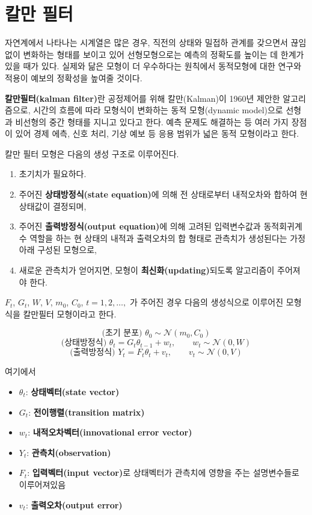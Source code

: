 \documentclass[b5paper,]{scrbook}
\theoremstyle{plain}
\theoremstyle{definition}
\numberwithin{equation}{section}
\begin{document}
\hypertarget{kalman}{%
\chapter{칼만 필터}\label{kalman}}

자연계에서 나타나는 시계열은 많은 경우, 직전의 상태와 밀접하 관계를 갖으면서 끊임없이 변화하는 형태를 보이고 있어 선형모형으로는 예측의 정확도를 높이는 데 한계가 있을 때가 있다. 실제와 닮은 모형이 더 우수하다는 원칙에서 동적모형에 대한 연구와 적용이 예보의 정확성을 높여줄 것이다.

\textbf{칼만필터(kalman filter)}란 공정제어를 위해 칼만(Kalman)이 1960년 제안한 알고리즘으로, 시간의 흐름에 따라 모형식이 변화하는 동적 모형(dynamic model)으로 선형과 비선형의 중간 형태를 지니고 있다고 한다. 예측 문제도 해결하는 등 여러 가지 장점이 있어 경제 에측, 신호 처리, 기상 예보 등 응용 범위가 넓은 동적 모형이라고 한다.

칼만 필터 모형은 다음의 생성 구조로 이루어진다.

\begin{enumerate}
\def\labelenumi{\arabic{enumi}.}
\item
  초기치가 필요하다.
\item
  주어진 \textbf{상태방정식(state equation)}에 의해 전 상태로부터 내적오차와 합하여 현 상태값이 결정되며,
\item
  주어진 \textbf{출력방정식(output equation)}에 의해 고려된 입력변수값과 동적회귀계수 역할을 하는 현 상태의 내적과 출력오차의 합 형태로 관측치가 생성된다는 가정 아래 구성된 모형으로,
\item
  새로운 관측치가 얻어지면, 모형이 \textbf{최신화(updating)}되도록 알고리즘이 주어져야 한다.
\end{enumerate}

\(F_{t}\), \(G_{t}\), \(W\), \(V\), \(m_{0}\), \(C_{0}\), \(t=1,2,\ldots,\) 가 주어진 경우 다음의 생성식으로 이루어진 모형식을 칼만필터 모형이라고 한다.

\[\text{(초기 분포) } \theta_{0} \sim \mathcal{N}(m_{0},C_{0})\]
\[\text{(상태방정식) } \theta_{t}=G_{t}\theta_{t-1}+w_{t}, \qquad{w_{t} \sim \mathcal{N}(0,W)}\]
\[\text{(출력방정식) } Y_{t}=F_{t}\theta_{t}+v_{t}, \qquad{v_{t}\sim \mathcal{N}(0,V)}\]

여기에서

\begin{itemize}
\item
  \(\theta_{t}\): \textbf{상태벡터(state vector)}
\item
  \(G_{t}\): \textbf{전이행렬(transition matrix)}
\item
  \(w_{t}\): \textbf{내적오차벡터(innovational error vector)}
\item
  \(Y_{t}\): \textbf{관측치(observation)}
\item
  \(F_{t}\): \textbf{입력벡터(input vector)}로 상태벡터가 관측치에 영향을 주는 설명변수들로 이루어져있음
\item
  \(v_{t}\): \textbf{출력오차(output error)}
\end{itemize}
\end{document}
